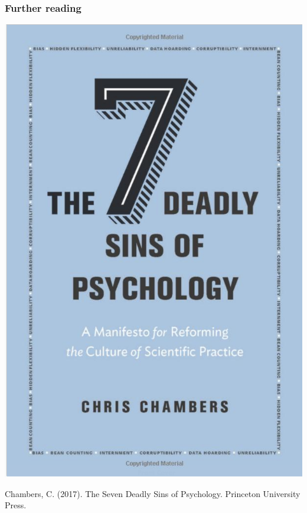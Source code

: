 \documentclass{beamer}
\begin{document}

\begin{frame}
\frametitle{Further reading}

\begin{center}
\includegraphics[scale=0.2]{chambers.png}
\end{center}

\begin{footnotesize}
Chambers, C. (2017). The Seven Deadly Sins of Psychology. Princeton University Press. 
\end{footnotesize}

\end{frame}
\end{document}
